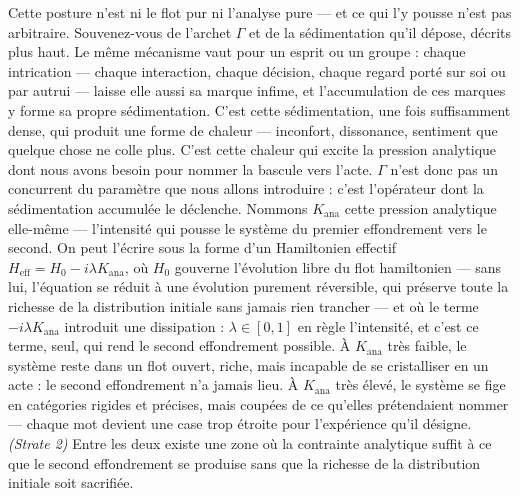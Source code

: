 \documentclass[french, 11pt, twoside, openright, a5paper]{book}
\begin{document}
Cette posture n'est ni le flot pur ni l'analyse pure --- et ce qui l'y
pousse n'est pas arbitraire. Souvenez-vous de l'archet $\Gamma$ et de la
sédimentation qu'il dépose, décrits plus haut. Le même mécanisme vaut
pour un esprit ou un groupe : chaque intrication --- chaque interaction,
chaque décision, chaque regard porté sur soi ou par autrui --- laisse
elle aussi sa marque infime, et l'accumulation de ces marques y forme sa
propre sédimentation. C'est cette sédimentation, une fois suffisamment
dense, qui produit une forme de chaleur --- inconfort, dissonance,
sentiment que quelque chose ne colle plus. C'est cette chaleur qui
excite la pression analytique dont nous avons besoin pour nommer la
bascule vers l'acte. $\Gamma$ n'est donc pas un concurrent du paramètre que
nous allons introduire : c'est l'opérateur dont la sédimentation
accumulée le déclenche. Nommons $K_{\text{ana}}$ cette pression analytique elle-même --- l'intensité qui pousse le système du premier effondrement vers le second. On peut l'écrire sous la forme d'un Hamiltonien effectif $H_{\text{eff}} = H_0 - i\lambda K_{\text{ana}}$, où $H_0$ gouverne l'évolution libre du flot hamiltonien --- sans lui, l'équation se réduit à une
évolution purement réversible, qui préserve toute la richesse de la
distribution initiale sans jamais rien trancher --- et où le terme
$-i\lambda K_{\text{ana}}$ introduit une dissipation : $\lambda \in [0,1]$ en règle l'intensité,
et c'est ce terme, seul, qui rend le second effondrement possible. À
$K_{\text{ana}}$ très faible, le système reste dans un flot ouvert, riche, mais
incapable de se cristalliser en un acte : le second effondrement n'a
jamais lieu. À $K_{\text{ana}}$ très élevé, le système se fige en catégories
rigides et précises, mais coupées de ce qu'elles prétendaient nommer ---
chaque mot devient une case trop étroite pour l'expérience qu'il
désigne. \emph{(Strate 2)} Entre les deux existe une zone où la
contrainte analytique suffit à ce que le second effondrement se produise
sans que la richesse de la distribution initiale soit sacrifiée.
\end{document}
